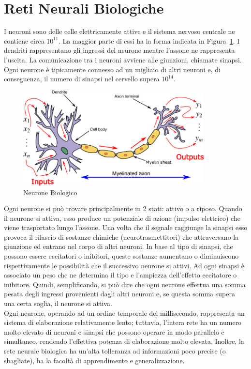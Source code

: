 \documentclass[11pt,a4paper,twoside,
openright]{book}
\begin{document}
\section{Reti Neurali Biologiche}
I neuroni sono delle celle elettricamente attive e il sistema nervoso centrale ne contiene circa $10^{11}$. La maggior parte di essi ha la forma indicata in Figura~\ref{fig:neurbio}. I dendriti rappresentano gli ingressi del neurone mentre l’assone ne rappresenta l’uscita. La comunicazione tra i neuroni avviene alle giunzioni, chiamate sinapsi. Ogni neurone è tipicamente connesso ad un migliaio di altri neuroni e, di conseguenza, il numero di sinapsi nel cervello supera $10^{14}$.
\begin{figure}[h!]
\begin{center}
\includegraphics[width=280pt]{BioNeuron.png}
\caption{Neurone Biologico~\cite{pict_neur}}
\end{center}
\label{fig:neurbio}
\end{figure}

Ogni neurone si può trovare principalmente in 2 stati: attivo o a riposo. Quando il neurone si attiva, esso produce un potenziale di azione (impulso elettrico) che viene trasportato lungo l’assone. Una volta che il segnale raggiunge la sinapsi esso provoca il rilascio di sostanze chimiche (neurotrasmettitori) che attraversano la giunzione ed entrano nel corpo di altri neuroni. In base al tipo di sinapsi, che possono essere eccitatori o inibitori, queste sostanze aumentano o diminuiscono rispettivamente le possibilità che il successivo neurone si attivi. Ad ogni sinapsi è associato un peso che ne determina il tipo e l’ampiezza dell’effetto eccitatore o inibitore. Quindi, semplificando, si può dire che ogni neurone effettua una somma pesata degli ingressi provenienti dagli altri neuroni e, se questa somma supera una certa soglia, il neurone si attiva.\\
Ogni neurone, operando ad un ordine temporale del millisecondo, rappresenta un sistema di elaborazione relativamente lento; tuttavia, l’intera rete ha un numero molto elevato di neuroni e sinapsi che possono operare in modo parallelo e simultaneo, rendendo l’effettiva potenza di elaborazione molto elevata. Inoltre, la rete neurale biologica ha un’alta tolleranza ad informazioni poco precise (o sbagliate), ha la facoltà di apprendimento e generalizzazione.
\end{document}
